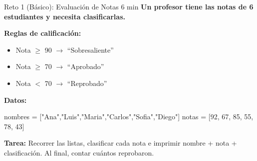 \documentclass[aspectratio=169, 11pt]{beamer}
\begin{document}
\begin{frame}[fragile,shrink=30]{Reto 1 (Básico): Evaluación de Notas \hfill {\normalsize\color{arcaRed}\faClock\hspace{4pt}6 min}}
  \vspace{-6pt}
  {\small\color{arcaDark}\bfseries
    Un profesor tiene las notas de 6 estudiantes y necesita clasificarlas.}

  \vspace{5pt}
  {\footnotesize\color{textMuted}
    \textbf{Reglas de calificación:}
    \begin{itemize}\setlength{\itemsep}{2pt}
      \item Nota $\geq$ 90 $\rightarrow$ ``Sobresaliente''
      \item Nota $\geq$ 70 $\rightarrow$ ``Aprobado''
      \item Nota $<$ 70 $\rightarrow$ ``Reprobado''
    \end{itemize}
  }

  \vspace{5pt}
  {\footnotesize\color{arcaDark}\bfseries Datos:}
  \begin{pyblock}
nombres = ["Ana","Luis","Maria","Carlos","Sofia","Diego"]
notas   = [92, 67, 85, 55, 78, 43]
  \end{pyblock}

  \vspace{3pt}
  {\footnotesize\color{textMuted}
    \textbf{Tarea:} Recorrer las listas, clasificar cada nota e
    imprimir nombre + nota + clasificación.
    Al final, contar cuántos reprobaron.
  }
\end{frame}
\end{document}
